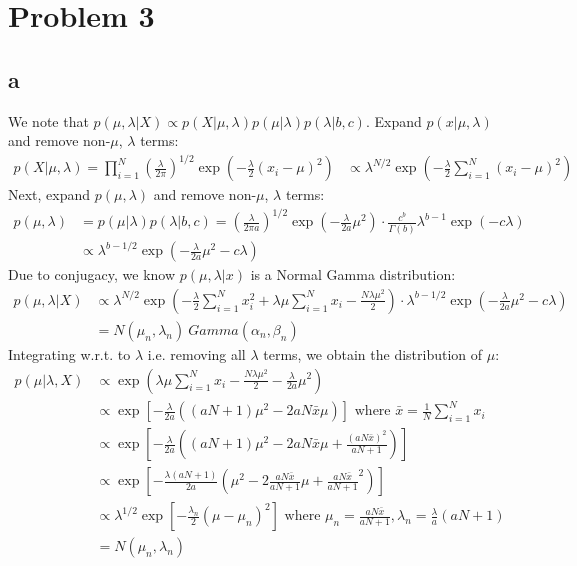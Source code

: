 \documentclass[twoside]{homework}
\begin{document}
\section*{Problem 3}
\subsection*{a}
We note that $p(\mu, \lambda | X) \propto p(X | \mu, \lambda) p(\mu | \lambda) p(\lambda | b, c)$. Expand $p(x | \mu, \lambda)$ and remove non-$\mu$, $\lambda$ terms:
\begin{align*}
p(X | \mu, \lambda) = \prod_{i=1}^N \left( \frac{\lambda}{2\pi} \right)^{1/2} \exp \left(-\frac{\lambda}{2}  (x_i - \mu)^2 \right)
&\propto \lambda^{N/2} \exp \left(-\frac{\lambda}{2} \sum_{i=1}^N (x_i - \mu)^2 \right)
\end{align*}
Next, expand $p(\mu, \lambda)$ and remove non-$\mu$, $\lambda$ terms:
\begin{align*}
p(\mu, \lambda) 
&= p(\mu | \lambda) p(\lambda | b, c) = \left( \frac{\lambda}{2 \pi a} \right)^{1/2} \exp \left(-\frac{\lambda}{2a} \mu^2 \right) \cdot \frac{c^b}{\Gamma(b)} \lambda^{b-1} \exp(-c \lambda)\\
&\propto \lambda^{b - 1/2} \exp \left(-\frac{\lambda}{2a} \mu^2 -c \lambda \right)  
\end{align*}
Due to conjugacy, we know  $p(\mu, \lambda | x)$ is a Normal Gamma distribution:
\begin{align*}
p(\mu, \lambda | X) 
&\propto \lambda^{N/2} \exp \left(- \frac{\lambda}{2} \sum_{i = 1}^N x_i^2 + \lambda \mu \sum_{i = 1}^N x_i -\frac{N \lambda \mu^2}{2} \right) \cdot \lambda^{b - 1/2} \exp \left(-\frac{\lambda}{2a} \mu^2 -c \lambda \right)\\
&= N(\mu_n, \lambda_n)\ Gamma(\alpha_n, \beta_n)
\end{align*}
Integrating w.r.t. to $\lambda$ i.e. removing all $\lambda$ terms, we obtain the distribution of $\mu$:
\begin{align*}
p(\mu | \lambda, X)
&\propto \exp \left(\lambda \mu \sum_{i = 1}^N x_i -\frac{N \lambda \mu^2}{2} -\frac{\lambda}{2a} \mu^2 \right)\\
&\propto \exp \left[-\frac{\lambda}{2a} \left( (aN + 1)\mu^2 - 2 a N \bar{x} \mu \right) \right] \textrm{ where } \bar{x} = \frac{1}{N} \sum_{i=1}^N x_i \\
&\propto \exp \left[-\frac{\lambda}{2a} \left( (aN + 1)\mu^2 - 2 a N \bar{x} \mu + \frac{(a N \bar{x})^2}{aN + 1} \right) \right]\\
&\propto \exp \left[-\frac{\lambda(aN + 1)}{2a} \left( \mu^2 - 2 \frac{a N \bar{x}}{aN + 1} \mu + \frac{a N \bar{x}}{aN + 1}^2 \right) \right]\\
&\propto \lambda^{1/2} \exp \left[-\frac{\lambda_n}{2} \left(\mu - \mu_n \right)^2 \right] \textrm{ where } \mu_n = \frac{a N \bar{x}}{aN + 1}, \lambda_n = \frac{\lambda}{a}(aN + 1) \\
&= N(\mu_n, \lambda_n)
\end{align*}
\end{document}

